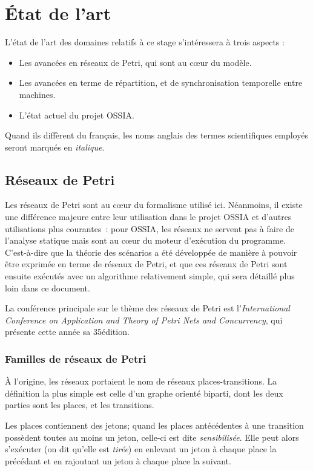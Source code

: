 \chapter{État de l'art}
\label{chapterStateOfTheArt}
L'état de l'art des domaines relatifs à ce stage s'intéressera à trois aspects : 
\begin{itemize}
	\item Les avancées en réseaux de Petri, qui sont au cœur du modèle.
	\item Les avancées en terme de répartition, et de synchronisation temporelle entre machines.
	\item L'état actuel du projet \ac{OSSIA}. 
\end{itemize}

Quand ils diffèrent du français, les noms anglais des termes scientifiques employés seront marqués en \textit{italique}.

\section{Réseaux de Petri}
Les réseaux de Petri\cite{petri1962kommunikation} sont au cœur du formalisme utilisé ici. Néanmoins, il existe une différence majeure entre leur utilisation dans le projet \ac{OSSIA} et d'autres utilisations plus courantes~: pour \ac{OSSIA}, les réseaux ne servent pas à faire de l'analyse statique mais sont au cœur du moteur d'exécution du programme. C'est-à-dire que la théorie des scénarios a été développée de manière à pouvoir être exprimée en terme de réseaux de Petri, et que ces réseaux de Petri sont ensuite exécutés avec un algorithme relativement simple, qui sera détaillé plus loin dans ce document.

La conférence principale sur le thème des réseaux de Petri est l'\textit{International Conference on Application and Theory of Petri Nets and Concurrency}, qui présente cette année sa 35\ieme édition.

\subsection{Familles de réseaux de Petri}
À l'origine, les réseaux portaient le nom de réseaux places-transitions. La définition la plus simple est celle d'un graphe orienté biparti, dont les deux parties sont les places, et les transitions.

Les places contiennent des jetons; quand les places antécédentes à une transition possèdent toutes au moins un jeton, celle-ci est dite \textit{sensibilisée}. Elle peut alors s'exécuter (on dit qu'elle est \textit{tirée}) en enlevant un jeton à chaque place la précédant et en rajoutant un jeton à chaque place la suivant.

